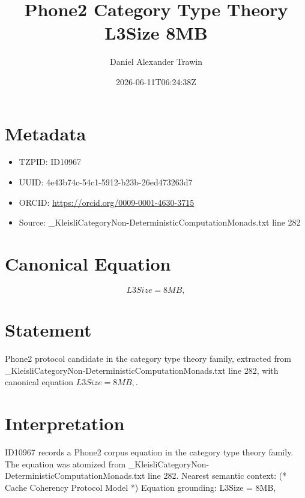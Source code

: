 \documentclass[11pt]{article}
\title{Phone2 Category Type Theory L3Size 8MB}
\author{Daniel Alexander Trawin}
\date{2026-06-11T06:24:38Z}
\begin{document}
\maketitle
\section*{Metadata}
\begin{itemize}
\item TZPID: ID10967
\item UUID: 4e43b74c-54c1-5912-b23b-26ed473263d7
\item ORCID: \url{https://orcid.org/0009-0001-4630-3715}
\item Source: _KleisliCategoryNon-DeterministicComputationMonads.txt line 282
\end{itemize}
\section*{Canonical Equation}
\[
L3Size = 8MB,
\]
\section*{Statement}
Phone2 protocol candidate in the category type theory family, extracted from _KleisliCategoryNon-DeterministicComputationMonads.txt line 282, with canonical equation $L3Size = 8MB,$.
\section*{Interpretation}
ID10967 records a Phone2 corpus equation in the category type theory family. The equation was atomized from _KleisliCategoryNon-DeterministicComputationMonads.txt line 282. Nearest semantic context: (* Cache Coherency Protocol Model *) Equation grounding: L3Size = 8MB,
\end{document}
